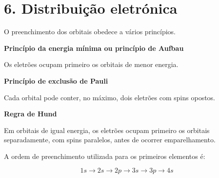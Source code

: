 \documentclass[11pt,a4paper]{article}
\begin{document}
	
	\section*{\textcolor{eublue}{6. Distribuição eletrónica}}
	
	\begin{recorda}
		
		O preenchimento dos orbitais obedece a vários princípios.
		
		\textbf{Princípio da energia mínima ou princípio de Aufbau}
		
		Os eletrões ocupam primeiro os orbitais de menor energia.
		
		\vspace{2mm}
		
		\textbf{Princípio de exclusão de Pauli}
		
		Cada orbital pode conter, no máximo, dois eletrões com spins opostos.
		
		\vspace{2mm}
		
		\textbf{Regra de Hund}
		
		Em orbitais de igual energia, os eletrões ocupam primeiro os orbitais
		separadamente, com spins paralelos, antes de ocorrer emparelhamento.
		
		\vspace{2mm}
		
		A ordem de preenchimento utilizada para os primeiros elementos é:
		
		\[
		\boxed{
			1s
			\rightarrow
			2s
			\rightarrow
			2p
			\rightarrow
			3s
			\rightarrow
			3p
			\rightarrow
			4s
		}
		\]
		
	\end{recorda}
	
	
\end{document}
